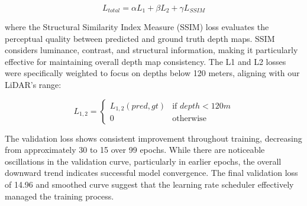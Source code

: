 \[
L_{total} = \alpha L_1 + \beta L_2 + \gamma L_{SSIM}
\]


where the Structural Similarity Index Measure (SSIM) loss evaluates the perceptual quality between predicted and ground truth depth maps. SSIM considers luminance, contrast, and structural information, making it particularly effective for maintaining overall depth map consistency. The L1 and L2 losses were specifically weighted to focus on depths below 120 meters, aligning with our LiDAR's range:

\[
    L_{1,2} = \begin{cases}
    L_{1,2}(pred, gt) & \text{if } depth < 120m \\
    0 & \text{otherwise}
    \end{cases}
\]

The validation loss shows consistent improvement throughout training, decreasing from approximately 30 to 15 over 99 epochs. While there are noticeable oscillations in the validation curve, particularly in earlier epochs, the overall downward trend indicates successful model convergence. The final validation loss of 14.96 and smoothed curve suggest that the learning rate scheduler effectively managed the training process.


